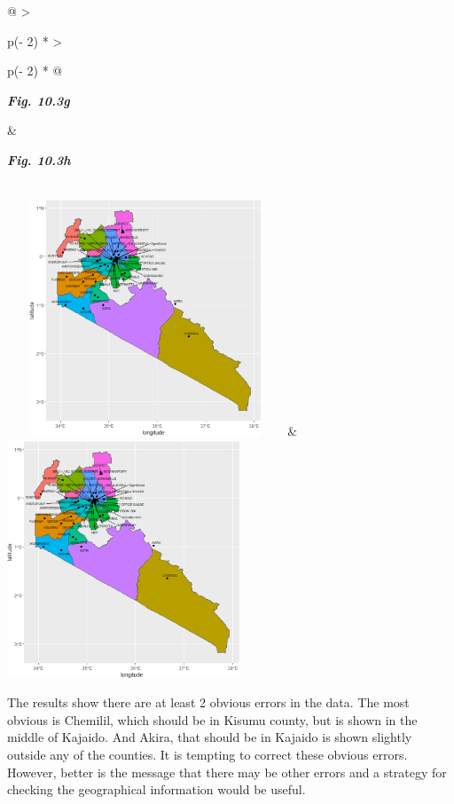 \documentclass[
  letterpaper,
  DIV=11,
  numbers=noendperiod]{scrreprt}
\begin{document}
\begin{longtable}[]{@{}
  >{\raggedright\arraybackslash}p{(\columnwidth - 2\tabcolsep) * }
  >{\raggedright\arraybackslash}p{(\columnwidth - 2\tabcolsep) * }@{}}
\toprule\noalign{}
\begin{minipage}[b]{\linewidth}\raggedright
\textbf{\emph{Fig. 10.3g}}
\end{minipage} & \begin{minipage}[b]{\linewidth}\raggedright
\textbf{\emph{Fig. 10.3h}}
\end{minipage} \\
\midrule\noalign{}
\endhead
\bottomrule\noalign{}
\endlastfoot
\includegraphics[width=3.24492in,height=2.78295in]{figures/Fig10.3g.png}
&
\includegraphics[width=2.72977in,height=2.78905in]{figures/Fig10.3h.png} \\
\end{longtable}

The results show there are at least 2 obvious errors in the data. The
most obvious is Chemilil, which should be in Kisumu county, but is shown
in the middle of Kajaido. And Akira, that should be in Kajaido is shown
slightly outside any of the counties. It is tempting to correct these
obvious errors. However, better is the message that there may be other
errors and a strategy for checking the geographical information would be
useful.
\end{document}
